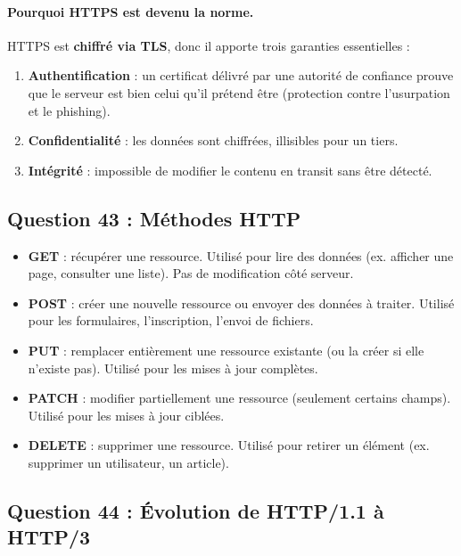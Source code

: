 \documentclass[12pt,a4paper]{article}
\begin{document}
\paragraph{Pourquoi HTTPS est devenu la norme.} HTTPS est \textbf{chiffr\'e via TLS}, donc il apporte trois garanties essentielles :
\begin{enumerate}
  \item \textbf{Authentification} : un certificat d\'elivr\'e par une autorit\'e de confiance prouve que le serveur est bien celui qu'il pr\'etend \^etre (protection contre l'usurpation et le phishing).
  \item \textbf{Confidentialit\'e} : les donn\'ees sont chiffr\'ees, illisibles pour un tiers.
  \item \textbf{Int\'egrit\'e} : impossible de modifier le contenu en transit sans \^etre d\'etect\'e.
\end{enumerate}

\subsection*{Question 43 : M\'ethodes HTTP}

\begin{itemize}
  \item \textbf{GET} : r\'ecup\'erer une ressource. Utilis\'e pour lire des donn\'ees (ex. afficher une page, consulter une liste). Pas de modification c\^ot\'e serveur.
  \item \textbf{POST} : cr\'eer une nouvelle ressource ou envoyer des donn\'ees \`a traiter. Utilis\'e pour les formulaires, l'inscription, l'envoi de fichiers.
  \item \textbf{PUT} : remplacer enti\`erement une ressource existante (ou la cr\'eer si elle n'existe pas). Utilis\'e pour les mises \`a jour compl\`etes.
  \item \textbf{PATCH} : modifier partiellement une ressource (seulement certains champs). Utilis\'e pour les mises \`a jour cibl\'ees.
  \item \textbf{DELETE} : supprimer une ressource. Utilis\'e pour retirer un \'el\'ement (ex. supprimer un utilisateur, un article).
\end{itemize}

\subsection*{Question 44 : \'Evolution de HTTP/1.1 \`a HTTP/3}
\end{document}
